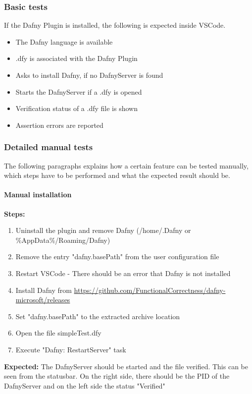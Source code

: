 \subsubsection{Basic tests}
If the Dafny Plugin is installed, the following is expected inside VSCode. 
\begin{itemize}
\item The Dafny language is available
\item .dfy is associated with the Dafny Plugin
\item Asks to install Dafny, if no DafnyServer is found 
\item Starts the DafnyServer if a .dfy is opened
\item Verification status of a .dfy file is shown
\item Assertion errors are reported
\end{itemize}

\subsubsection{Detailed manual tests}
The following paragraphs explains how a certain feature can be tested manually, which steps have to be performed and what the expected result should be.

\paragraph{Manual installation}
\textbf{\newline Steps:}
\begin{enumerate}
\item Uninstall the plugin and remove Dafny (/home/.Dafny or \%AppData\%/Roaming/Dafny)
\item Remove the entry "dafny.basePath" from the user configuration file 
\item Restart VSCode - There should be an error that Dafny is not installed
\item Install Dafny from \href{https://github.com/FunctionalCorrectness/dafny-microsoft/releases}{https://github.com/FunctionalCorrectness/dafny-microsoft/releases}
\item Set "dafny.basePath" to the extracted archive location
\item Open the file simpleTest.dfy
\item Execute "Dafny: RestartServer" task
\end{enumerate}
\textbf{\newline Expected:}
The DafnyServer should be started and the file verified. This can be seen from the statusbar. On the right side, there should be the PID of the DafnyServer and on the left side the status "Verified"

